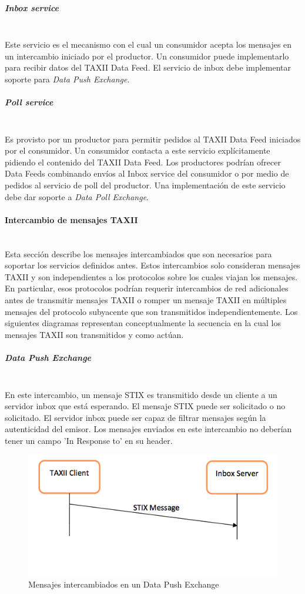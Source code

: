 \subparagraph{Inbox service}\ \\
Este servicio es el mecanismo con el cual un consumidor acepta los mensajes en 
un intercambio iniciado por el productor. Un consumidor puede implementarlo 
para recibir datos del TAXII Data Feed.
El servicio de inbox debe implementar soporte para \textit{Data Push Exchange}.

\subparagraph{Poll service}\ \\
Es provisto por un productor para permitir pedidos al TAXII Data Feed iniciados 
por  el consumidor. Un consumidor contacta a este servicio explícitamente 
pidiendo el contenido del TAXII Data Feed. Los productores podrían ofrecer Data 
Feeds combinando envíos al Inbox service del consumidor o por medio de pedidos 
al servicio de poll del productor.
Una implementación de este servicio debe dar soporte a \textit{Data Poll Exchange}.

\paragraph{Intercambio de mensajes TAXII}\ \\

Esta sección describe los mensajes intercambiados que son necesarios para soportar 
los servicios definidos antes. Estos intercambios solo consideran mensajes 
TAXII y son independientes a los protocolos sobre los cuales viajan los mensajes.
 En particular, esos protocolos podrían requerir intercambios de red 
adicionales antes de transmitir mensajes TAXII o romper un mensaje TAXII en 
múltiples mensajes del protocolo subyacente que son transmitidos 
independientemente. Los siguientes diagramas representan conceptualmente la 
secuencia en la cual los mensajes TAXII son transmitidos y como actúan.

\subparagraph{Data Push Exchange}\ \\
En este intercambio, un mensaje STIX es transmitido desde un cliente a un 
servidor inbox que está esperando. El mensaje STIX puede ser solicitado o no 
solicitado. El servidor inbox puede ser capaz de filtrar mensajes según la 
autenticidad del emisor. Los mensajes enviados en este intercambio no deberían 
tener un campo 'In Response to' en su header.

\begin{figure}[ht!]
  \centering
    \includegraphics[width=150mm]{./images/DataPushExchange.png}
    \caption{Mensajes intercambiados en un Data Push Exchange \protect\cite{b1}}
\end{figure}

